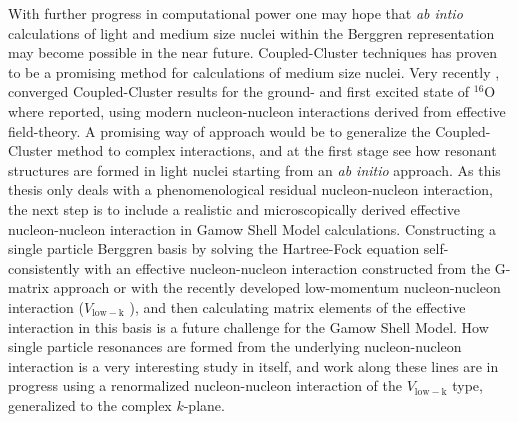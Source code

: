 With further progress in computational power   
one may hope that \emph{ab intio}  calculations of light and medium 
size nuclei within the Berggren representation may become possible in the near future. 
Coupled-Cluster techniques has proven to be a promising method for 
calculations of medium size nuclei. 
Very recently \cite{cc1,cc2,cc3}, converged Coupled-Cluster 
results for the ground- and first excited state of $^{16}$O where reported, using 
modern nucleon-nucleon interactions derived from effective field-theory.
A promising way of approach would be 
to generalize the Coupled-Cluster method to complex interactions, and
at the first stage see how resonant structures are formed in light nuclei
starting from an  \emph{ab initio} approach. 
As this thesis only deals with a phenomenological residual nucleon-nucleon 
interaction, the next step is to include a realistic and microscopically derived 
effective nucleon-nucleon interaction in Gamow Shell Model calculations. 
Constructing a single particle Berggren basis by solving the Hartree-Fock
equation self-consistently with an effective nucleon-nucleon interaction 
constructed from the G-matrix approach or with the recently
developed low-momentum nucleon-nucleon interaction ($V_{\mathrm{low-k}}$ ),
and then calculating matrix elements of the effective interaction in
this basis is a future challenge for the Gamow Shell Model.
How single particle resonances are formed from the underlying 
nucleon-nucleon interaction is a very interesting study in itself, and
work along these lines are in progress using a renormalized nucleon-nucleon  
interaction of the $V_{\mathrm{low-k}}$   type, generalized to the complex 
$k$-plane.


